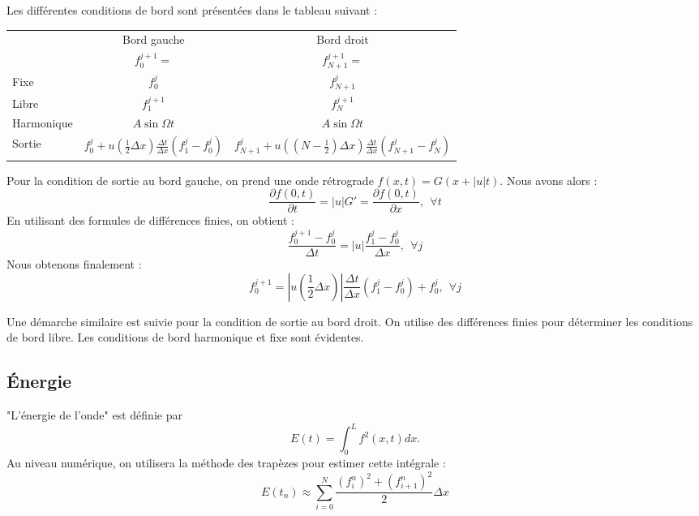 \documentclass[a4paper,12pt,oneside]{article}
\def \be {\begin{equation}}
\def \ee {\end{equation}}
\def \dx  {\Delta x}
\def \dt  {\Delta t}
\begin{document}
Les différentes conditions de bord sont présentées dans le tableau suivant :
\begin{table}[H]
\begin{center}
\begin{tabular}{l|c|c|}
\cline{2-3}
                       & Bord gauche  & Bord droit  \\ %
                       & $f_{0}^{j+1}=$ & $f_{N+1}^{j+1}=$ \\ \hline
\multicolumn{1}{|l|}{Fixe} & $f_{0}^{j}$ & $f_{N+1}^{j}$ \\ \hline
\multicolumn{1}{|l|}{Libre} & $f_{1}^{j+1}$  & $f_{N}^{j+1}$ \\ \hline
\multicolumn{1}{|l|}{Harmonique} & $A\sin{\Omega t}$  & $A\sin{\Omega t}$  \\ \hline
\multicolumn{1}{|l|}{Sortie} & $f_0^j+u(\frac{1}{2}\dx) \frac{\dt}{\dx} (f_1^j-f_0^j)$ & $f_{N+1}^j+u((N-\frac{1}{2})\dx) \frac{\dt}{\dx}  (f_{N+1}^j-f_{N}^j)$ \\ \hline
\end{tabular}
\end{center}
\end{table}
Pour la condition de sortie au bord gauche, on prend une onde rétrograde $f(x,t) = G(x+|u|t)$. Nous avons alors :
\begin{equation}
    \frac{\partial f(0,t)}{\partial t} = |u|G' =\frac{\partial f(0,t)}{\partial x},\ \  \forall t
\end{equation}
En utilisant des formules de différences finies, on obtient :
\begin{equation}
    \frac{f_{0}^{j+1}-f_{0}^{j}}{\Delta t} = |u|  \frac{f_{1}^{j}-f_{0}^{j}}{\Delta x} ,\ \  \forall j
\end{equation}
Nous obtenons finalement :
\begin{equation}
    f_{0}^{j+1} = |u(\frac{1}{2}\dx)| \frac{\Delta t}{\Delta x} \left( f_{1}^{j}-f_{0}^{j} \right) + f_{0}^{j},\ \  \forall j
\end{equation}

Une démarche similaire est suivie pour la condition de sortie au bord droit. On utilise des différences finies pour déterminer les conditions de bord libre. Les conditions de bord harmonique et fixe sont évidentes.

\subsection{Énergie}
"L'énergie de l'onde" est définie par 
\be 
E(t)=\int_0^Lf^2(x,t)dx.
\label{eq:energie}
\ee 
Au niveau numérique, on utilisera la méthode des trapèzes pour estimer cette intégrale :
\be 
E(t_n) \approx \sum_{i=0}^N \frac{(f_i^n)^2+(f_{i+1}^n)^2}{2}\dx
\ee
\end{document}
